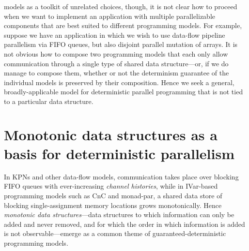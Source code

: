 models as a toolkit of unrelated choices, though, it is not clear how
to proceed when we want to implement an application with multiple
parallelizable components that are best suited to different
programming models.  For example, suppose we have an application in
which we wish to use data-flow pipeline parallelism via FIFO queues,
but also disjoint parallel mutation of arrays.  It is not obvious how
to compose two programming models that each only allow communication
through a single type of shared data structure---or, if we do manage
to compose them, whether or not the determinism guarantee of the
individual models is preserved by their composition.  Hence we seek a
general, broadly-applicable model for deterministic parallel
programming that is not tied to a particular data structure.

\section{Monotonic data structures as a basis for deterministic parallelism}\label{s:intro-monotonic}

In KPNs and other data-flow models, communication takes place over
blocking FIFO queues with ever-increasing \emph{channel histories},
while in IVar-based programming models such as CnC and monad-par, a
shared data store of blocking single-assignment memory locations grows
monotonically.  Hence \emph{monotonic data structures}---data
structures to which information can only be added and never removed,
and for which the order in which information is added is not
observable---emerge as a common theme of guaranteed-deterministic
programming models.

